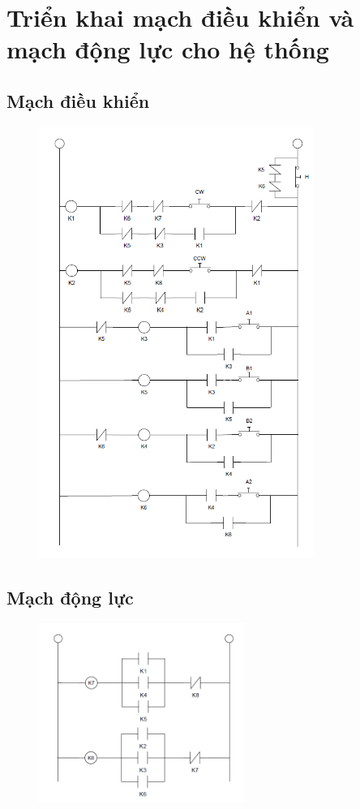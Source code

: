 \section{Triển khai mạch điều khiển và mạch động lực cho hệ thống}
\subsection{Mạch điều khiển}
\begin{figure}[H]
    \centering
    \includegraphics[width=0.8\textwidth]{pictures/control.png}
\end{figure}
\cleardoublepage
\subsection{Mạch động lực}
\begin{figure}[H]
    \centering
    \includegraphics[width=0.6\textwidth]{pictures/power.png}
\end{figure}
